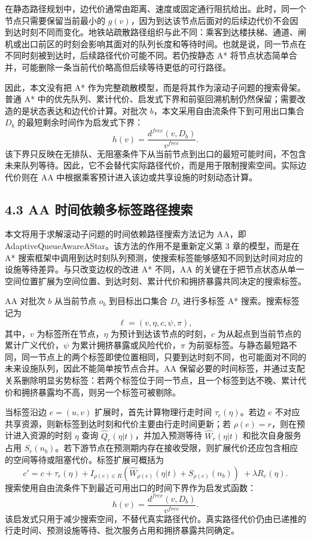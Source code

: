 \documentclass[UTF8,a4paper,12pt]{ctexart}
\begin{document}
在静态路径规划中，边代价通常由距离、速度或固定通行阻抗给出。此时，同一个节点只需要保留当前最小的 \(g(v)\)，因为到达该节点后面对的后续边代价不会因到达时刻不同而变化。地铁站疏散路径组织与此不同：乘客到达楼扶梯、通道、闸机或出口前区的时刻会影响其面对的队列长度和等待时间。也就是说，同一节点在不同时刻被到达时，后续路径代价可能不同。若仍按静态 A* 将节点状态简单合并，可能删除一条当前代价略高但后续等待更低的可行路径。

因此，本文没有把 A* 作为完整疏散模型，而是将其作为滚动子问题的搜索骨架。普通 A* 中的优先队列、累计代价、启发式下界和前驱回溯机制仍然保留；需要改造的是状态表达和边代价计算。对批次 \(b\)，本文采用自由流条件下到可用出口集合 \(D_b\) 的最短剩余时间作为启发式下界：
\[
h(v)=\frac{d^{free}(v,D_b)}{v^{free}}.
\]
该下界只反映在无排队、无阻塞条件下从当前节点到出口的最短可能时间，不包含未来队列等待。因此，它不会替代实际路径代价，而是用于限制搜索空间。实际边代价则在 AA 中根据乘客预计进入该边或共享设施的时刻动态计算。

\subsection{4.3 AA 时间依赖多标签路径搜索}

本文将用于求解滚动子问题的时间依赖路径搜索方法记为 AA，即 AdaptiveQueueAwareAStar。该方法的作用不是重新定义第 3 章的模型，而是在 A* 搜索框架中调用到达时刻队列预测，使搜索标签能够感知不同到达时间对应的设施等待差异。与只改变边权的改进 A* 不同，AA 的关键在于把节点状态从单一空间位置扩展为空间位置、到达时刻、累计代价和拥挤暴露共同决定的搜索标签。

AA 对批次 \(b\) 从当前节点 \(o_b\) 到目标出口集合 \(D_b\) 进行多标签 A* 搜索。搜索标签记为
\[
\ell=(v,\eta,c,\psi,\pi),
\]
其中，\(v\) 为标签所在节点，\(\eta\) 为预计到达该节点的时刻，\(c\) 为从起点到当前节点的累计广义代价，\(\psi\) 为累计拥挤暴露或风险代价，\(\pi\) 为前驱标签。与静态最短路不同，同一节点上的两个标签即使位置相同，只要到达时刻不同，也可能面对不同的未来设施队列，因此不能简单按节点合并。AA 保留必要的时间标签，并通过支配关系删除明显劣势标签：若两个标签位于同一节点，且一个标签到达不晚、累计代价和拥挤暴露均不高，则另一个标签可被剔除。

当标签沿边 \(e=(u,v)\) 扩展时，首先计算物理行走时间 \(\tau_e(\eta)\)。若边 \(e\) 不对应共享资源，则新标签到达时刻和代价主要由行走时间更新；若 \(\rho(e)=r\)，则在预计进入资源的时刻 \(\eta\) 查询 \(\widehat Q_r(\eta|t)\)，并加入预测等待 \(\widehat W_r(\eta|t)\) 和批次自身服务占用 \(S_r(n_b)\)。若下游节点在预测期内存在接收受限，则扩展代价还应包含相应的空间等待或阻塞代价。标签扩展可概括为
\[
c'=
c+\tau_e(\eta)+I_{\rho(e)\in R}
\left(\widehat W_{\rho(e)}(\eta|t)+S_{\rho(e)}(n_b)\right)
\;+
\lambda R_e(\eta).
\]
搜索使用自由流条件下到最近可用出口的时间下界作为启发式函数：
\[
h(v)=\frac{d^{free}(v,D_b)}{v^{free}}.
\]
该启发式只用于减少搜索空间，不替代真实路径代价。真实路径代价仍由已递推的行走时间、预测设施等待、批次服务占用和拥挤暴露共同确定。
\end{document}
